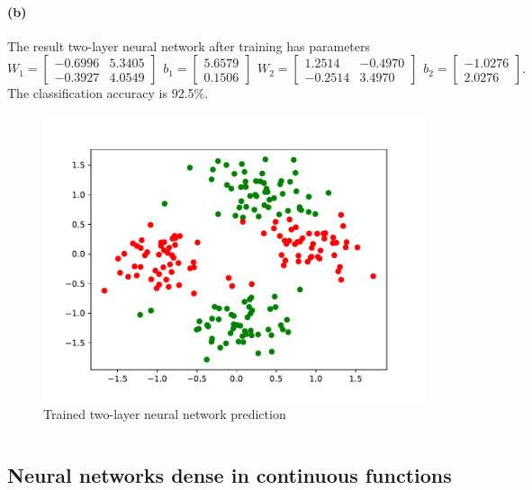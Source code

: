 \documentclass[12pt]{article}
\begin{document}
\paragraph{(b)}
The result two-layer neural network after training has parameters
\[ W_1=\begin{bmatrix} -0.6996 & 5.3405 \\ -0.3927 & 4.0549 \end{bmatrix} \hspace{5pt}
   b_1=\begin{bmatrix} 5.6579 \\ 0.1506 \end{bmatrix} \hspace{5pt}
   W_2=\begin{bmatrix} 1.2514 & -0.4970 \\ -0.2514 & 3.4970 \end{bmatrix} \hspace{5pt}
   b_2=\begin{bmatrix} -1.0276 \\ 2.0276 \end{bmatrix}. \]
The classification accuracy is 92.5\%.
\begin{figure}[htbp]
    \centering
    \includegraphics[scale=0.9]{Homework2/ex1b.pdf}
    \caption{Trained two-layer neural network prediction}
\end{figure}
\inputminted[breaklines=true, linenos=true]{python}{./Homework2/ex1.py}
\newpage

\subsection{Neural networks dense in continuous functions}
\end{document}
